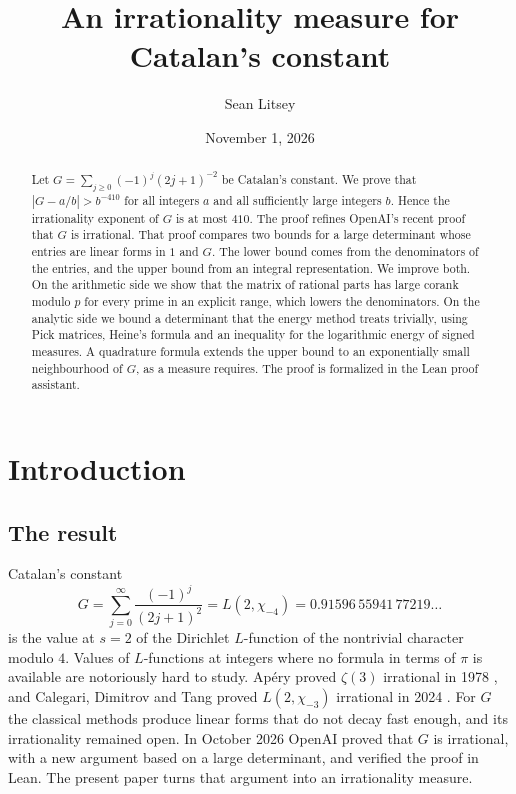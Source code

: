 \documentclass[11pt]{amsart}
\theoremstyle{definition}
\theoremstyle{remark}
\numberwithin{equation}{section}
\begin{document}
\title{An irrationality measure for Catalan's constant}

\author{Sean Litsey}

\date{November 1, 2026}



\begin{abstract}
Let $G=\sum_{j\ge0}(-1)^j(2j+1)^{-2}$ be Catalan's constant. We prove that $|G-a/b|>b^{-410}$ for all
integers $a$ and all sufficiently large integers $b$. Hence the irrationality exponent of $G$ is at most
$410$. The proof refines OpenAI's recent proof that $G$ is irrational. That proof compares two bounds for
a large determinant whose entries are linear forms in $1$ and $G$. The lower bound comes from the
denominators of the entries, and the upper bound from an integral representation. We improve both. On the
arithmetic side we show that the matrix of rational parts has large corank modulo $p$ for every prime in
an explicit range, which lowers the denominators. On the analytic side we bound a determinant that the
energy method treats trivially, using Pick matrices, Heine's formula and an inequality for the
logarithmic energy of signed measures. A quadrature formula extends the upper bound to an exponentially
small neighbourhood of $G$, as a measure requires. The proof is formalized in the Lean proof assistant.
\end{abstract}

\maketitle

\tableofcontents

\section{Introduction}\label{sec:intro}

\subsection{The result}
Catalan's constant
\[
 G=\sum_{j=0}^\infty\frac{(-1)^j}{(2j+1)^2}=L(2,\chi_{-4})=0.91596\,55941\,77219\ldots
\]
is the value at $s=2$ of the Dirichlet $L$-function of the nontrivial character modulo $4$. Values of
$L$-functions at integers where no formula in terms of $\pi$ is available are notoriously hard to study.
Ap\'ery proved $\zeta(3)$ irrational in 1978 \cite{Apery79}, and Calegari, Dimitrov and Tang proved
$L(2,\chi_{-3})$ irrational in 2024 \cite{CDT2024}. For $G$ the classical methods produce linear forms
that do not decay fast enough, and its irrationality remained open. In October 2026 OpenAI
\cite{OpenAI2026} proved that $G$ is irrational, with a new argument based on a large determinant, and
verified the proof in Lean. The present paper turns that argument into an irrationality measure.
\end{document}

